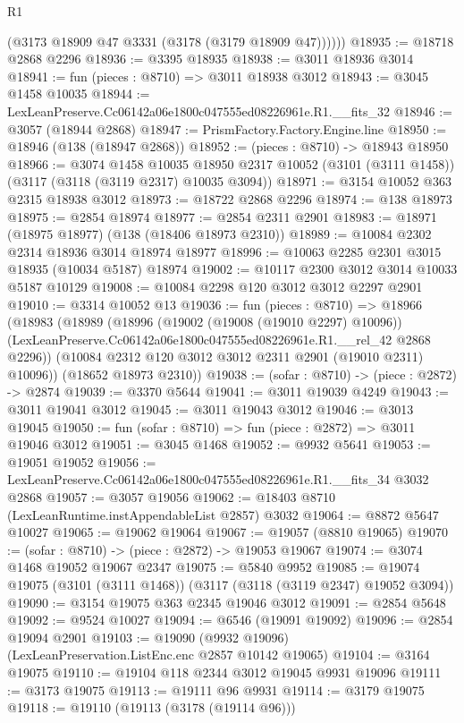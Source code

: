 \begin{lexlean}{R1}
\begin{coremodule}
          (@3173 @18909 @47 @3331 (@3178 (@3179 @18909 @47))))))
@18935 := @18718 @2868 @2296
@18936 := @3395 @18935
@18938 := @3011 @18936 @3014
@18941 := fun (pieces : @8710) => @3011 @18938 @3012
@18943 := @3045 @1458 @10035
@18944 := LexLeanPreserve.Cc06142a06e1800c047555ed08226961e.R1.__fits_32
@18946 := @3057 (@18944 @2868)
@18947 := PrismFactory.Factory.Engine.line
@18950 := @18946 (@138 (@18947 @2868))
@18952 := (pieces : @8710) -> @18943 @18950
@18966 := @3074
    @1458
    @10035
    @18950
    @2317
    @10052
    (@3101 (@3111 @1458))
    (@3117 (@3118 (@3119 @2317) @10035 @3094))
@18971 := @3154 @10052 @363 @2315 @18938 @3012
@18973 := @18722 @2868 @2296
@18974 := @138 @18973
@18975 := @2854 @18974
@18977 := @2854 @2311 @2901
@18983 := @18971 (@18975 @18977) (@138 (@18406 @18973 @2310))
@18989 := @10084 @2302 @2314 @18936 @3014 @18974 @18977
@18996 := @10063 @2285 @2301 @3015 @18935 (@10034 @5187) @18974
@19002 := @10117 @2300 @3012 @3014 @10033 @5187 @10129
@19008 := @10084 @2298 @120 @3012 @3012 @2297 @2901
@19010 := @3314 @10052 @13
@19036 := fun (pieces : @8710) =>
  @18966
    (@18983
      (@18989
        (@18996
          (@19002 (@19008 (@19010 @2297) @10096))
          (LexLeanPreserve.Cc06142a06e1800c047555ed08226961e.R1.__rel_42 @2868 @2296))
        (@10084 @2312 @120 @3012 @3012 @2311 @2901 (@19010 @2311) @10096))
      (@18652 @18973 @2310))
@19038 := (sofar : @8710) -> (piece : @2872) -> @2874
@19039 := @3370 @5644
@19041 := @3011 @19039 @4249
@19043 := @3011 @19041 @3012
@19045 := @3011 @19043 @3012
@19046 := @3013 @19045
@19050 := fun (sofar : @8710) => fun (piece : @2872) => @3011 @19046 @3012
@19051 := @3045 @1468
@19052 := @9932 @5641
@19053 := @19051 @19052
@19056 := LexLeanPreserve.Cc06142a06e1800c047555ed08226961e.R1.__fits_34 @3032 @2868
@19057 := @3057 @19056
@19062 := @18403 @8710 (LexLeanRuntime.instAppendableList @2857) @3032
@19064 := @8872 @5647 @10027
@19065 := @19062 @19064
@19067 := @19057 (@8810 @19065)
@19070 := (sofar : @8710) -> (piece : @2872) -> @19053 @19067
@19074 := @3074 @1468 @19052 @19067 @2347
@19075 := @5840 @9952
@19085 := @19074 @19075 (@3101 (@3111 @1468)) (@3117 (@3118 (@3119 @2347) @19052 @3094))
@19090 := @3154 @19075 @363 @2345 @19046 @3012
@19091 := @2854 @5648
@19092 := @9524 @10027
@19094 := @6546 (@19091 @19092)
@19096 := @2854 @19094 @2901
@19103 := @19090 (@9932 @19096) (LexLeanPreservation.ListEnc.enc @2857 @10142 @19065)
@19104 := @3164 @19075
@19110 := @19104 @118 @2344 @3012 @19045 @9931 @19096
@19111 := @3173 @19075
@19113 := @19111 @96 @9931
@19114 := @3179 @19075
@19118 := @19110 (@19113 (@3178 (@19114 @96)))

\end{coremodule}
\end{lexlean}
